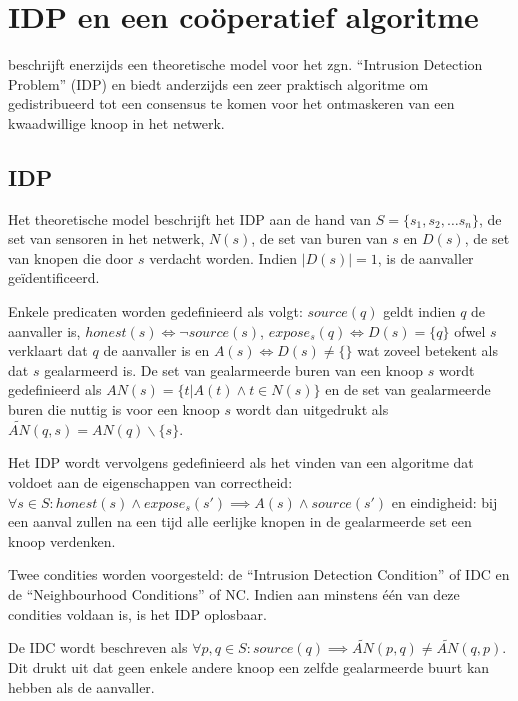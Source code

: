 
\chapter{IDP en een co\"operatief algoritme}
\label{appendix:idp-cooperation}

\citep{krontiris2009cooperative} beschrijft enerzijds een theoretische model
voor het zgn. ``Intrusion Detection Problem'' (IDP) en biedt anderzijds een
zeer praktisch algoritme om gedistribueerd tot een consensus te komen voor het
ontmaskeren van een kwaadwillige knoop in het netwerk.

\section{IDP}
\label{section:idp}

Het theoretische model beschrijft het IDP aan de hand van $S = \{ s_1, s_2,
\dots s_n \}$, de set van sensoren in het netwerk, $N(s)$, de set van buren van
$s$ en $D(s)$, de set van knopen die door $s$ verdacht worden. Indien $|D(s)| =
1$, is de aanvaller ge\"identificeerd.

Enkele predicaten worden gedefinieerd als volgt: $source(q)$ geldt indien $q$
de aanvaller is, $honest(s) \iff \neg source(s)$, $expose_s(q) \iff D(s) = \{ q
\}$ ofwel $s$ verklaart dat $q$ de aanvaller is en $A(s) \iff D(s) \not= \{\}$
wat zoveel betekent als dat $s$ gealarmeerd is. De set van gealarmeerde buren
van een knoop $s$ wordt gedefinieerd als $AN(s) = \{ t | A(t) \wedge t \in N(s)
\}$ en de set van gealarmeerde buren die nuttig is voor een knoop $s$ wordt dan
uitgedrukt als $\tilde{AN}(q,s) = AN(q) \backslash \{s\}$.

Het IDP wordt vervolgens gedefinieerd als het vinden van een algoritme dat
voldoet aan de eigenschappen van correctheid: $\forall s \in S : honest(s)
\wedge expose_s(s') \implies A(s) \wedge source(s')$ en eindigheid: bij een
aanval zullen na een tijd alle eerlijke knopen in de gealarmeerde set een knoop
verdenken.

Twee condities worden voorgesteld: de ``Intrusion Detection Condition'' of IDC
en de ``Neighbourhood Conditions'' of NC. Indien aan minstens \'e\'en van deze
condities voldaan is, is het IDP oplosbaar.

De IDC wordt beschreven als $\forall p,q \in S : source(q) \implies
\tilde{AN}(p,q) \not= \tilde{AN}(q,p)$. Dit drukt uit dat geen enkele andere
knoop een zelfde gealarmeerde buurt kan hebben als de aanvaller.

